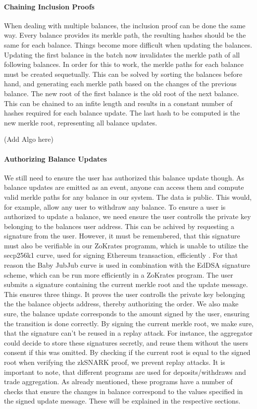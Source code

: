 \documentclass[../../thesis.tex]{subfiles}
\begin{document}
\paragraph{Chaining Inclusion Proofs} \label{chain_inclusion}
When dealing with multiple balances, the inclusion proof can be done the same way. Every balance provides its merkle path, the resulting hashes should be the same for each balance. Things become more difficult when updating the balances. Updating the first balance in the batch now invalidates the merkle path of all following balances. In order for this to work, the merkle paths for each balance must be created sequetually. This can be solved by sorting the balances before hand, and generating each merkle path based on the changes of the previous balance. The new root of the first balance is the old root of the next balance. This can be chained to an infite length and results in a constant number of hashes required for each balance update. The last hash to be computed is the new merkle root, representing all balance updates.

(Add Algo here)

\paragraph{Authorizing Balance Updates}
We still need to ensure the user has authorized this balance update though. As balance updates are emitted as an event, anyone can access them and compute valid merkle paths for any balance in our system. The data is public. This would, for example, allow any user to withdraw any balance. To ensure a user is authorized to update a balance, we need ensure the user controlls the private key belonging to the balances user address. This can be achived by requesting a signature from the user. However, it must be remembered, that this signature must also be verifiable in our ZoKrates programm, which is unable to utilize the secp256k1 curve, used for signing Ethereum transaction, efficiently \cite{deml_2019}. For that reason the Baby JubJub curve is used in combination with the EdDSA signature scheme, which can be run more efficiently in a ZoKrates program. The user submits a signature containing the current merkle root and the update message. This ensures three things. It proves the user controlls the private key belonging the the balance objects address, thereby authorizing the order. We also make sure, the balance update corresponds to the amount signed by the user, ensuring the transition is done correctly. By signing the current merkle root, we make sure, that the signature can't be reused in a replay attack. For instance, the aggregator could decide to store these signatures secretly, and reuse them without the users consent if this was omitted. By checking if the current root is equal to the signed root when verifying the zkSNARK proof, we prevent replay attacks. It is important to note, that different programs are used for deposits/withdraws and trade aggregation. As already mentioned, these programs have a number of checks that ensure the changes in balance correspond to the values specified in the signed update message. These will be explained in the respective sections. 
\end{document}
